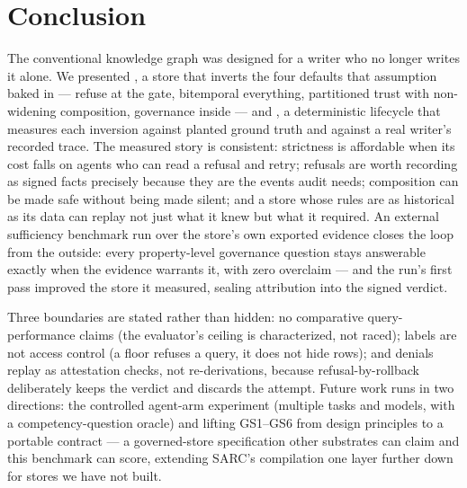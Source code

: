 \section{Conclusion}
\label{sec:conclusion}

The conventional knowledge graph was designed for a writer who no
longer writes it alone. We presented \sys, a store that inverts the
four defaults that assumption baked in --- refuse at the gate,
bitemporal everything, partitioned trust with non-widening
composition, governance inside --- and \census, a deterministic
lifecycle that measures each inversion against planted ground truth
and against a real writer's recorded trace. The measured story is
consistent: strictness is affordable when its cost falls on agents who
can read a refusal and retry; refusals are worth recording as signed
facts precisely because they are the events audit needs; composition
can be made safe without being made silent; and a store whose rules
are as historical as its data can replay not just what it knew but
what it required. An external sufficiency benchmark run over the
store's own exported evidence closes the loop from the outside:
every property-level governance question stays answerable exactly
when the evidence warrants it, with zero overclaim --- and the run's
first pass improved the store it measured, sealing attribution into
the signed verdict.

Three boundaries are stated rather than hidden: no comparative
query-performance claims (the evaluator's ceiling is characterized,
not raced); labels are not access control (a floor refuses a query, it
does not hide rows); and denials replay as attestation checks, not
re-derivations, because refusal-by-rollback deliberately keeps the
verdict and discards the attempt. Future work runs in two directions:
the controlled agent-arm experiment (multiple tasks and models, with a
competency-question oracle) and lifting GS1--GS6 from design principles
to a portable contract --- a governed-store specification other
substrates can claim and this benchmark can score, extending SARC's
compilation one layer further down for stores we have not built.
